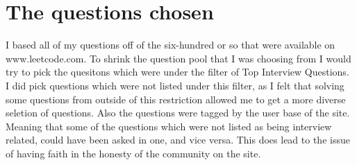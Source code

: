 \documentclass[10pt,twocolumn]{IEEEtran}
\begin{document}
\section{The questions chosen}
I based all of my questions off of the six-hundred or so that were available on www.leetcode.com\cite{leet1}. To shrink the question pool that I was choosing from I would try to pick the quesitons which were under the filter of Top Interview Questions. I did pick questions which were not listed under this filter, as I felt that solving some questions from outside of this restriction allowed me to get a more diverse seletion of questions. Also the questions were tagged by the user base of the site. Meaning that some of the questions which were not listed as being interview related, could have been asked in one, and vice versa. This does lead to the issue of having faith in the honesty of the community on the site.  
\end{document}
